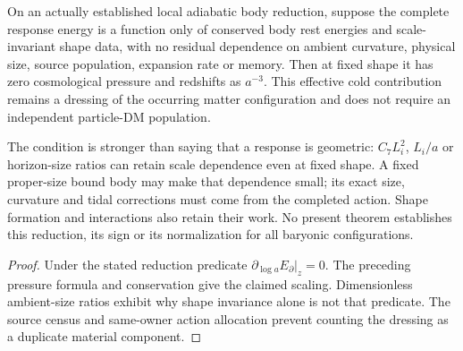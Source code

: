 \documentclass[12pt,a4paper]{article}
\begin{document}
\begin{corollary}
\label{p8:cor:v2205-matter-attached-dressing}
On an actually established local adiabatic body reduction, suppose the
complete response energy is a function only of conserved body rest
energies and scale-invariant shape data, with no residual dependence on
ambient curvature, physical size, source population, expansion rate or
memory. Then at fixed shape it has zero cosmological pressure and
redshifts as $a^{-3}$. This effective cold contribution remains a dressing
of the occurring matter configuration and does not require an independent
particle-DM population.

The condition is stronger than saying that a response is geometric:
$C_7L_i^2$, $L_i/a$ or horizon-size ratios can retain scale dependence
even at fixed shape. A fixed proper-size bound body may make that
dependence small; its exact size, curvature and tidal corrections must
come from the completed action. Shape formation and interactions also
retain their work. No present theorem establishes this reduction,
its sign or its normalization for all baryonic configurations.
\end{corollary}
\begin{proof}
Under the stated reduction predicate
$\partial_{\log a}E_\partial|_z=0$.
The preceding pressure formula and conservation give the claimed scaling.
Dimensionless ambient-size ratios exhibit why shape invariance alone is
not that predicate. The source census and same-owner action allocation
prevent counting the dressing as a duplicate material component.
\end{proof}

\end{document}
